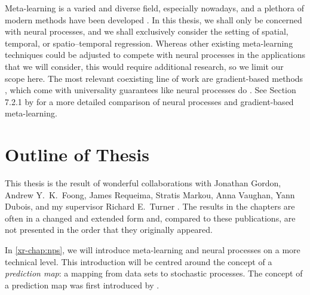 \documentclass[12pt, twoside]{report}
\newcommand{\xrprefix}[1]{xr-#1}
\begin{document}
Meta-learning is a varied and diverse field, especially nowadays,
and a plethora of modern methods have been developed
\parencite{Andrychowicz:2016:Learning_to_Learn_by_Gradient,
Vinyals:2016:Matching_Networks_for_One_Shot,
Ravi:2017:Optimization_as_a_Model_for,
Edwards:2017:Towards_a_Neural_Statistician,
Snell:2017:Prototypical_Networks_for_Few-Shot_Learning,
Finn:2017:Model-Agnostic_Meta-Learning_for_Fast_Adaptation,
Garnelo:2018:Conditional_Neural_Processes,
Gordon:2019:Meta-Learning_Probabilistic_Inference_for_Prediction,
Requeima:2019:Fast_and_Flexible_Multi-Task_Classification}.
In this thesis, we shall only be concerned with neural processes,
and we shall exclusively consider the setting of spatial, temporal, or spatio--temporal regression.
Whereas other existing meta-learning techniques could be adjusted to compete with neural processes in the applications that we will consider, this would require additional research, so we limit our scope here.
The most relevant coexisting line of work are gradient-based methods \parencite{Finn:2017:Model-Agnostic_Meta-Learning_for_Fast_Adaptation,Finn:2018:Probabilistic_Model-Agnostic_Meta-Learning}, which come with universality guarantees like neural processes do \parencite{Finn:2018:Meta-Learning_and_Universality_Deep_Representations}.
See Section 7.2.1 by \textcite{Gordon:2020:Advanced_in_Probabilistic_Meta-Learning} for a more detailed comparison of neural processes and gradient-based meta-learning.


\section{Outline of Thesis}
\label{sec:introduction:overview}

This thesis is the result of wonderful collaborations with 
Jonathan Gordon,
Andrew Y.\ K.\ Foong,
James Requeima,
Stratis Markou,
Anna Vaughan,
Yann Dubois,
and my supervisor
Richard E.\ Turner
\parencite{Gordon:2020:Convolutional_Conditional_Neural_Processes,
Foong:2020:Meta-Learning_Stationary_Stochastic_Process_Prediction,
Bruinsma:2021:The_Gaussian_Neural_Process,
Markou:2022:Practical_Conditional_Neural_Processes_for_Tractable}.
The results in the chapters are often in a changed and extended form and, compared to these publications, are not presented in the order that they originally appeared.



In \cref{\xrprefix{chap:nps}}, 
we will introduce meta-learning and neural processes on a more technical level.
This introduction will be centred around the concept of a \emph{prediction map}:
a mapping from data sets to stochastic processes.
The concept of a prediction map was first introduced by \textcite{Foong:2020:Meta-Learning_Stationary_Stochastic_Process_Prediction}.
\end{document}
